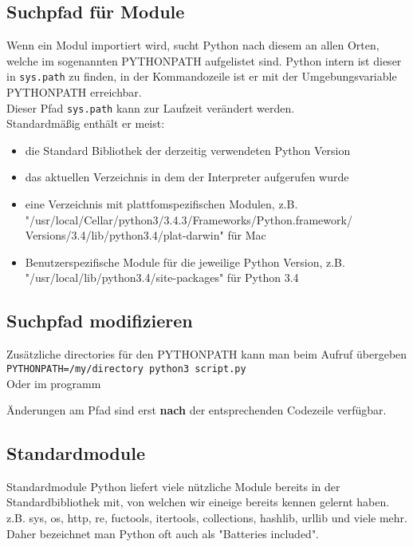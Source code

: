 \begin{frame}
	
	
\end{frame}

\subsection{Suchpfad für Module}
\begin{frame}
	Wenn ein Modul importiert wird, sucht Python nach diesem an allen Orten, welche im sogenannten PYTHONPATH aufgelistet sind. Python intern ist dieser in \texttt{sys.path} zu finden, in der Kommandozeile ist er mit der Umgebungsvariable PYTHONPATH erreichbar.\\
	Dieser Pfad \texttt{sys.path} kann zur Laufzeit verändert werden.\\
	Standardmä\ss{}ig enthält er meist:
	\begin{itemize}
		\item die Standard Bibliothek der derzeitig verwendeten Python Version
		\item das aktuellen Verzeichnis in dem der Interpreter aufgerufen wurde
		\item eine Verzeichnis mit plattfomspezifischen Modulen, z.B.
			"/usr/local/Cellar/python3/3.4.3/Frameworks/Python.framework/
			Versions/3.4/lib/python3.4/plat-darwin" für Mac
		\item Benutzerspezifische Module für die jeweilige Python Version, z.B. "/usr/local/lib/python3.4/site-packages" für Python 3.4
	\end{itemize}
\end{frame}

\subsection{Suchpfad modifizieren}
\begin{frame}
Zusätzliche directories für den PYTHONPATH kann man beim Aufruf übergeben\\
\texttt{PYTHONPATH=/my/directory python3 script.py}\\
Oder im programm

Änderungen am Pfad sind erst \textbf{nach} der entsprechenden Codezeile verfügbar.
\end{frame}

\subsection{Standardmodule}
\begin{frame}{Standardmodule}
	Python liefert viele nützliche Module bereits in der Standardbibliothek mit, von welchen wir eineige bereits kennen gelernt haben.
	z.B. sys, os, http, re, fuctools, itertools, collections, hashlib, urllib und viele mehr. Daher bezeichnet man Python oft auch als "Batteries included".
\end{frame}


